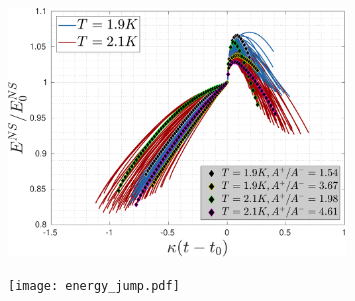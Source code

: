 \documentclass[11pt]{article}
\begin{document}
\begin{figure}
	\centering
	\includegraphics*[width=0.8\textwidth]{energy-evolution-1.pdf}
	\label{fig: energy-evolution}
	\caption{}
\end{figure}

\begin{figure}
	\centering
	\texttt{[image: energy\_jump.pdf]}
	\label{fig: energy-jump}
	\caption{}
\end{figure}
\end{document}
